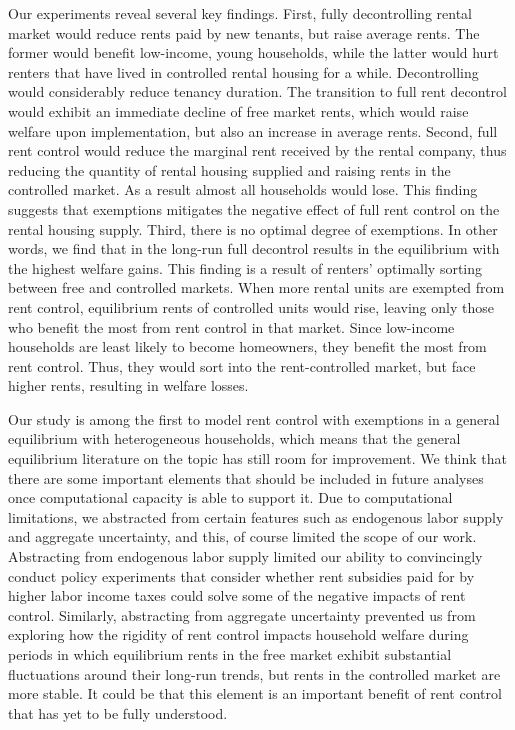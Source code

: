 \documentclass[parskip=full]{article}
\begin{document}
Our experiments reveal several key findings. First, fully decontrolling rental market would reduce rents paid by new tenants, but raise average rents. The former would benefit low-income, young households, while the latter would hurt renters that have lived in controlled rental housing for a while. Decontrolling would considerably reduce tenancy duration. The transition to full rent decontrol would exhibit an immediate decline of free market rents, which would raise welfare upon implementation, but also an increase in average rents. Second, full rent control would reduce the marginal rent received by the rental company, thus reducing the quantity of rental housing supplied and raising rents in the controlled market. As a result almost all households would lose. This finding suggests that exemptions mitigates the negative effect of full rent control on the rental housing supply. Third, there is no optimal degree of exemptions. In other words, we find that in the long-run full decontrol results in the equilibrium with the highest welfare gains. This finding is a result of renters' optimally sorting between free and controlled markets. When more rental units are exempted from rent control, equilibrium rents of controlled units would rise, leaving only those who benefit the most from rent control in that market. Since low-income households are least likely to become homeowners, they benefit the most from rent control. Thus, they would sort into the rent-controlled market, but face higher rents, resulting in welfare losses. 

Our study is among the first to model rent control with exemptions in a general equilibrium with heterogeneous households, which means that the general equilibrium literature on the topic has still room for improvement. We think that there are some important elements that should be included in future analyses once computational capacity is able to support it. Due to computational limitations, we abstracted from certain features such as endogenous labor supply and aggregate uncertainty, and this, of course limited the scope of our work. Abstracting from endogenous labor supply limited our ability to convincingly conduct policy experiments that consider whether rent subsidies paid for by higher labor income taxes could solve some of the negative impacts of rent control. Similarly, abstracting from aggregate uncertainty prevented us from exploring how the rigidity of rent control impacts household welfare during periods in which equilibrium rents in the free market exhibit substantial fluctuations around their long-run trends, but rents in the controlled market are more stable. It could be that this element is an important benefit of rent control that has yet to be fully understood.
\end{document}
